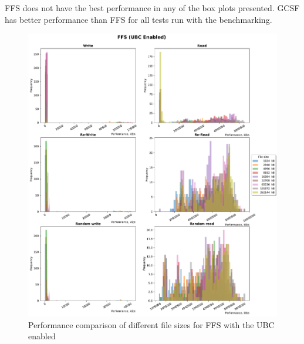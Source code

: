 \gls{FFS} does not have the best performance in any of the box plots presented. \gls{GCSF} has better performance than \gls{FFS} for all tests run with the benchmarking.



\begin{figure}[!htb]
	\label{fig:bench_ffs_with_cache}
	\begin{center}
		\includegraphics[width=1.0\textwidth]{figures.nosync/benchmarking/FFS/FFS-UBC Enabled-hist.pdf}
	\end{center}
	\caption{Performance comparison of different file sizes for FFS with the UBC enabled}
\end{figure}

